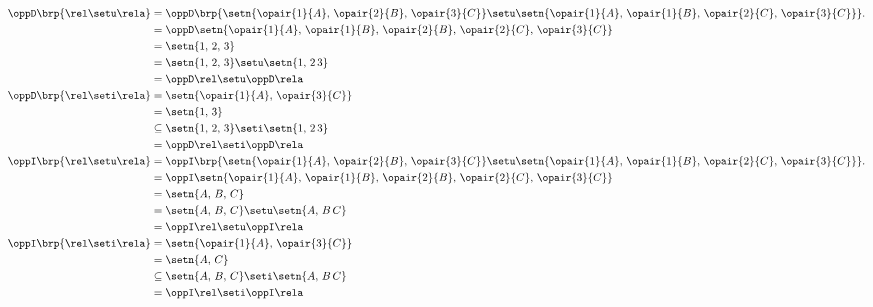 {\begin{example}
\begin{align*}
  \oppD\brp{\rel\setu\rela} 
    &= \oppD\brp{\setn{\opair{1}{A},\, \opair{2}{B},\, \opair{3}{C}} \setu \setn{\opair{1}{A},\, \opair{1}{B},\, \opair{2}{C},\, \opair{3}{C}}}.
  \\&= \oppD\setn{\opair{1}{A},\, \opair{1}{B},\, \opair{2}{B},\, \opair{2}{C},\, \opair{3}{C}}
  \\&= \setn{1,\,2,\,3}
  \\&= \setn{1,\,2,\,3}\setu\setn{1,\,2\,3}
  \\&=  \oppD\rel \setu \oppD\rela
  \\
  \oppD\brp{\rel\seti\rela} 
    &= \setn{\opair{1}{A},\, \opair{3}{C}} 
  \\&= \setn{1,\,3}
  \\&\subseteq \setn{1,\,2,\,3}\seti\setn{1,\,2\,3}
  \\&=  \oppD\rel \seti \oppD\rela
  \\
  \oppI\brp{\rel\setu\rela} 
    &= \oppI\brp{\setn{\opair{1}{A},\, \opair{2}{B},\, \opair{3}{C}} \setu \setn{\opair{1}{A},\, \opair{1}{B},\, \opair{2}{C},\, \opair{3}{C}}}.
  \\&= \oppI\setn{\opair{1}{A},\, \opair{1}{B},\, \opair{2}{B},\, \opair{2}{C},\, \opair{3}{C}}
  \\&= \setn{A,\,B,\,C}
  \\&= \setn{A,\,B,\,C}\setu\setn{A,\,B\,C}
  \\&= \oppI\rel \setu \oppI\rela
  \\
  \oppI\brp{\rel\seti\rela} 
    &= \setn{\opair{1}{A},\, \opair{3}{C}} 
  \\&= \setn{A,\,C}
  \\&\subseteq \setn{A,\,B,\,C}\seti\setn{A,\,B\,C}
  \\&=  \oppI\rel \seti \oppI\rela
\end{align*}

\end{example}



}
